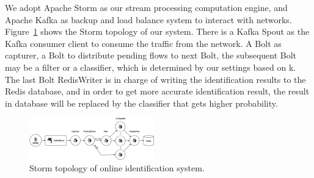 \documentclass[conference]{IEEEtran}
\begin{document}
We adopt Apache Storm as our stream processing computation engine, and Apache Kafka as backup and load balance system to interact with networks. Figure~\ref{fig:storm} shows the Storm topology of our system. There is a Kafka Spout as the Kafka consumer client to consume the traffic from the network. A Bolt as capturer, a Bolt to distribute pending flows to next Bolt, the subsequent Bolt may be a filter or a classifier, which is determined by our settings based on k. The last Bolt RedisWriter is in charge of writing the identification results to the Redis database, and in order to get more accurate identification result, the result in database will be replaced by the classifier that gets higher probability.

\begin{figure}[htp]
\begin{center}
\includegraphics[width=0.48\textwidth]{storm.eps}
\caption{Storm topology of online identification system.}\label{fig:storm}
\end{center}
\end{figure}



\end{document}
